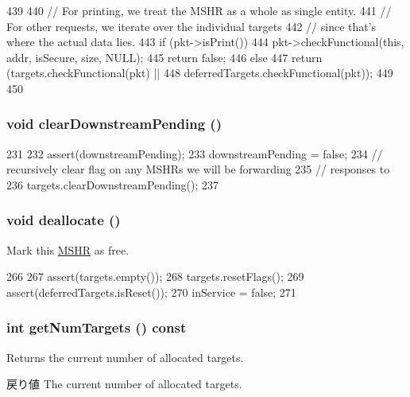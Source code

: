 \begin{DoxyCode}
439 {
440     // For printing, we treat the MSHR as a whole as single entity.
441     // For other requests, we iterate over the individual targets
442     // since that's where the actual data lies.
443     if (pkt->isPrint()) {
444         pkt->checkFunctional(this, addr, isSecure, size, NULL);
445         return false;
446     } else {
447         return (targets.checkFunctional(pkt) ||
448                 deferredTargets.checkFunctional(pkt));
449     }
450 }
\end{DoxyCode}
\hypertarget{classMSHR_aba459a1fb9c4f01c1911655c1db0e8e4}{
\subsubsection[{clearDownstreamPending}]{\setlength{\rightskip}{0pt plus 5cm}void clearDownstreamPending ()}}
\label{classMSHR_aba459a1fb9c4f01c1911655c1db0e8e4}



\begin{DoxyCode}
231 {
232     assert(downstreamPending);
233     downstreamPending = false;
234     // recursively clear flag on any MSHRs we will be forwarding
235     // responses to
236     targets.clearDownstreamPending();
237 }
\end{DoxyCode}
\hypertarget{classMSHR_a2d68be4fd20ffdd7f7a9b51579eacc2f}{
\subsubsection[{deallocate}]{\setlength{\rightskip}{0pt plus 5cm}void deallocate ()}}
\label{classMSHR_a2d68be4fd20ffdd7f7a9b51579eacc2f}
Mark this \hyperlink{classMSHR}{MSHR} as free. 


\begin{DoxyCode}
266 {
267     assert(targets.empty());
268     targets.resetFlags();
269     assert(deferredTargets.isReset());
270     inService = false;
271 }
\end{DoxyCode}
\hypertarget{classMSHR_ab22af10809b116b3a7ecba267c795c8a}{
\subsubsection[{getNumTargets}]{\setlength{\rightskip}{0pt plus 5cm}int getNumTargets () const}}
\label{classMSHR_ab22af10809b116b3a7ecba267c795c8a}
Returns the current number of allocated targets. \begin{DoxyReturn}{戻り値}
The current number of allocated targets. 
\end{DoxyReturn}



